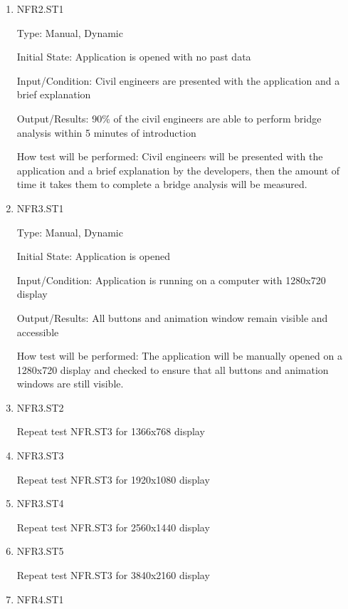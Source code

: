 \documentclass[12pt, titlepage]{article}
\begin{document}
\begin{enumerate}

\item{NFR2.ST1\\}

Type: Manual, Dynamic

Initial State: Application is opened with no past data

Input/Condition: Civil engineers are presented with the application and a brief explanation

Output/Results: 90\% of the civil engineers are able to perform bridge analysis within 5 minutes of introduction

How test will be performed: Civil engineers will be presented with the application and a brief explanation by the developers, then the amount of time it takes them to complete a bridge analysis will be measured.

\item{NFR3.ST1\\}

Type: Manual, Dynamic

Initial State: Application is opened

Input/Condition: Application is running on a computer with 1280x720 display

Output/Results: All buttons and animation window remain visible and accessible

How test will be performed: The application will be manually opened on a 1280x720 display and checked to ensure that all buttons and animation windows are still visible.

\item{NFR3.ST2\\}

Repeat test NFR.ST3 for 1366x768 display

\item{NFR3.ST3\\}

Repeat test NFR.ST3 for 1920x1080 display

\item{NFR3.ST4\\}

Repeat test NFR.ST3 for 2560x1440 display

\item{NFR3.ST5\\}

Repeat test NFR.ST3 for 3840x2160 display

\item{NFR4.ST1\\}


\end{enumerate}
\end{document}
